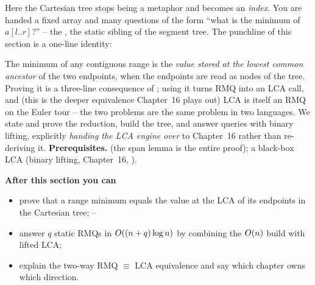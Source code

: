 \begin{topicintro}
Here the Cartesian tree stops being a metaphor and becomes an \emph{index}. You are handed a fixed array
and many questions of the form ``what is the minimum of $a[l..r]$?'' -- the ,
the static sibling of the segment tree. The punchline of this section is a one-line identity:

\begin{center}
\setlength{\fboxsep}{6pt}
\end{center}

The minimum of any contiguous range is the \emph{value stored at the lowest common ancestor} of the two
endpoints, when the endpoints are read as nodes of the tree. Proving it is a three-line consequence of
; using it turns RMQ into an LCA call, and (this is the deeper equivalence Chapter~16
plays out) LCA is itself an RMQ on the Euler tour -- the two problems are the same problem in two
languages. We state and prove the reduction, build the tree, and answer queries with binary lifting,
explicitly \emph{handing the LCA engine over} to Chapter~16 rather than re-deriving it.
\textbf{Prerequisites.}  (the span lemma is the entire proof); a black-box LCA
(binary lifting, Chapter~16, ).

\textbf{After this section you can}
\begin{itemize}[nosep]
  \item prove that a range minimum equals the value at the LCA of its endpoints in the Cartesian tree; \hfill{}--
  \item answer $q$ static RMQs in $O((n+q)\log n)$ by combining the $O(n)$ build with lifted LCA; \hfill{}
  \item explain the two-way RMQ $\equiv$ LCA equivalence and say which chapter owns which direction. \hfill{}
\end{itemize}
\end{topicintro}

